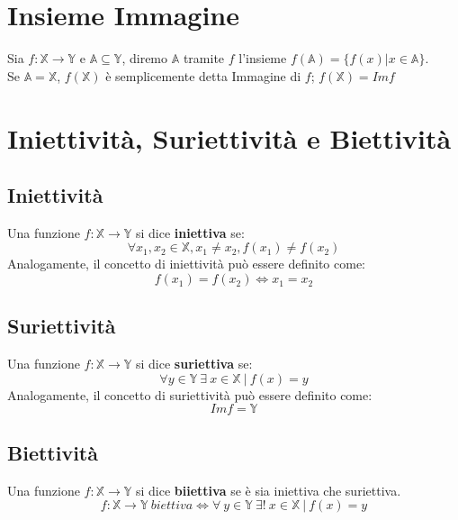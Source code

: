 \section{Insieme Immagine}
Sia $f: \mathbb{X} \rightarrow \mathbb{Y}$ e $\mathbb{A} \subseteq \mathbb{Y}$, diremo $\mathbb{A}$ tramite $f$ l'insieme $f(\mathbb{A}) = \{f(x) | x \in \mathbb{A}\}$.\\
Se $\mathbb{A} = \mathbb{X}$, $f(\mathbb{X})$ è semplicemente detta Immagine di $f$; $f(\mathbb{X}) = Imf$

\section{Iniettività, Suriettività e Biettività}
\subsection{Iniettività}
Una funzione $f: \mathbb{X} \rightarrow \mathbb{Y}$ si dice \textbf{iniettiva} se:
\begin{equation*}
\forall x_1,x_2 \in \mathbb{X}, x_1 \neq x_2, f(x_1) \neq f(x_2)
\end{equation*} 
Analogamente, il concetto di iniettività può essere definito come:
\begin{equation*}
f(x_1) = f(x_2) \iff x_1=x_2
\end{equation*}

\subsection{Suriettività}
Una funzione $f: \mathbb{X} \rightarrow \mathbb{Y}$ si dice \textbf{suriettiva} se:
\begin{equation*}
\forall y \in \mathbb{Y}\ \exists\ x \in \mathbb{X}\ |\ f(x) = y
\end{equation*} 
Analogamente, il concetto di suriettività può essere definito come:
\begin{equation*}
Imf = \mathbb{Y}
\end{equation*}

\subsection{Biettività}
Una funzione $f: \mathbb{X} \rightarrow \mathbb{Y}$ si dice \textbf{biiettiva} se è sia iniettiva che suriettiva.
\begin{equation*}
f: \mathbb{X} \rightarrow \mathbb{Y}\ biettiva \iff \forall\ y \in \mathbb{Y}\ \exists !\ x \in \mathbb{X}\ |\ f(x)=y
\end{equation*}

